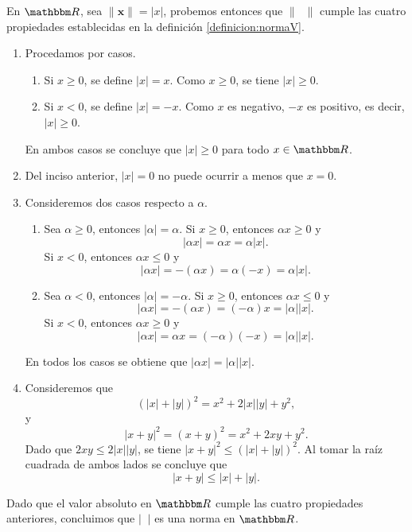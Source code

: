 \begin{examplebox}{}{}
    En $\RR$, sea $\| \mathbf{x} \| = |x|$, probemos entonces que $\| \phantom{x} \|$ cumple las cuatro propiedades establecidas en la definición \ref{definicion:normaV}.
    \begin{enumerate}[label=\roman*), topsep=6pt, itemsep=0pt]
        \item Procedamos por casos.
        \begin{enumerate}
            \item Si $x \geq 0$, se define $|x| = x$. Como $x \geq 0$, se tiene $|x| \geq 0$.
            \item Si $x < 0$, se define $|x| = -x$. Como $x$ es negativo, $-x$ es positivo, es decir, $|x| \geq 0$.
        \end{enumerate}
        En ambos casos se concluye que $|x| \geq 0$ para todo $x \in \RR$.
        \item Del inciso anterior, $|x| = 0$ no puede ocurrir a menos que $x = 0$.
        \item Consideremos dos casos respecto a $\alpha$.
        \begin{enumerate}
            \item Sea $\alpha \geq 0$, entonces $|\alpha| = \alpha$. Si $x \geq 0$, entonces $\alpha x \geq 0$ y
            $$|\alpha x| = \alpha x = \alpha |x|.$$
            Si $x < 0$, entonces $\alpha x \leq 0$ y
            $$|\alpha x| = -(\alpha x) = \alpha (-x) = \alpha |x|.$$
            \item Sea $\alpha < 0$, entonces $|\alpha| = -\alpha$. Si $x \geq 0$, entonces $\alpha x \leq 0$ y
            $$|\alpha x| = -(\alpha x) = (-\alpha) x = |\alpha| |x|.$$
            Si $x < 0$, entonces $\alpha x \geq 0$ y
            $$|\alpha x| = \alpha x = (-\alpha)(-x) = |\alpha| |x|.$$
        \end{enumerate}
        En todos los casos se obtiene que $|\alpha x| = |\alpha| |x|$.
        \item Consideremos que
        $$(|x| + |y|)^2 = x^2 + 2|x||y| + y^2,$$
        y
        $$|x + y|^2 = (x + y)^2 = x^2 + 2xy + y^2.$$
        Dado que $2xy \leq 2|x||y|$, se tiene $|x + y|^2 \leq (|x| + |y|)^2$. Al tomar la raíz cuadrada de ambos lados se concluye que
        $$|x + y| \leq |x| + |y|.$$
    \end{enumerate}
    Dado que el valor absoluto en $\RR$ cumple las cuatro propiedades anteriores, concluimos que $|\phantom{x}|$ es una norma en $\RR$.
\end{examplebox}

